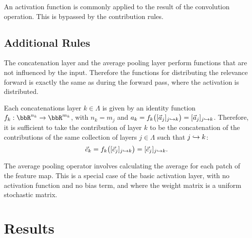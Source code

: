 An activation function is commonly applied to the result of the convolution operation. This is bypassed by the contribution rules. 

\subsection{Additional Rules}
The concatenation layer and the average pooling layer perform functions that are not influenced by the input. Therefore the functions for distributing the relevance forward is exactly the same as during the forward pass, where the activation is distributed.


Each concatenations layer $k\in \Lambda$ is given by an identity function $f_k:\bbR^{n_k} \to \bbR^{m_k}$, with $n_k=m_j$ and $a_k = f_k\big([\vec{a}_j]_{j\hookrightarrow k}\big) = [\vec{a}_j]_{j\hookrightarrow k}$. 
%
Therefore, it is sufficient to take the contribution of layer $k$ to be the concatenation of the contributions of the same collection of layers $j\in \Lambda$ such that $j\hookrightarrow k$: 
\begin{equation*}
    \vec{c}_k = f_k\big([\vec{c}_j]_{j\hookrightarrow k}\big) = [\vec{c}_j]_{j\hookrightarrow k}.
\end{equation*}


The average pooling operator involves calculating the average for each patch of the feature map. This is a special case of the basic activation layer, with no activation function and no bias term, and where the weight matrix is a uniform stochastic matrix.

\section{Results}




